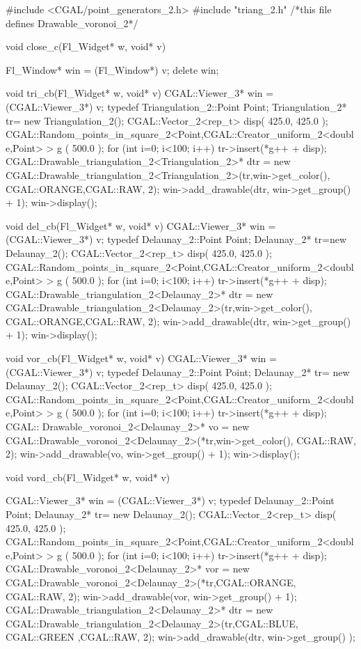 \begin{cprog} 
#include <CGAL/point_generators_2.h>
#include "triang_2.h"   /*this file defines Drawable_voronoi_2*/


void close_c(Fl_Widget* w, void* v)
{

  Fl_Window* win = (Fl_Window*) v;
  delete win;
}

void tri_cb(Fl_Widget* w, void* v)
{
  CGAL::Viewer_3* win = (CGAL::Viewer_3*) v;
  typedef Triangulation_2::Point Point;
  Triangulation_2* tr= new Triangulation_2();  
  CGAL::Vector_2<rep_t> disp( 425.0, 425.0 );
  CGAL::Random_points_in_square_2<Point,CGAL::Creator_uniform_2<double,Point> >
    g ( 500.0 );
  for (int i=0; i<100; i++)
    tr->insert(*g++ + disp);
  CGAL::Drawable_triangulation_2<Triangulation_2>* dtr = new CGAL::Drawable_triangulation_2<Triangulation_2>(tr,win->get_color(), CGAL::ORANGE,CGAL::RAW, 2);
  win->add_drawable(dtr, win->get_group() + 1);
  win->display();
}


void del_cb(Fl_Widget* w, void* v)
{
  CGAL::Viewer_3* win = (CGAL::Viewer_3*) v;
  typedef Delaunay_2::Point Point;
  Delaunay_2* tr=new Delaunay_2();  
  CGAL::Vector_2<rep_t> disp( 425.0, 425.0 );
  CGAL::Random_points_in_square_2<Point,CGAL::Creator_uniform_2<double,Point> >
    g ( 500.0 );
  for (int i=0; i<100; i++)
    tr->insert(*g++ + disp);
  CGAL::Drawable_triangulation_2<Delaunay_2>* dtr = new CGAL::Drawable_triangulation_2<Delaunay_2>(tr,win->get_color(),  CGAL::ORANGE,CGAL::RAW, 2);
  win->add_drawable(dtr, win->get_group() + 1);
  win->display();
}


void vor_cb(Fl_Widget* w, void* v)
{
  CGAL::Viewer_3* win = (CGAL::Viewer_3*) v;
  typedef Delaunay_2::Point Point;
  Delaunay_2* tr= new Delaunay_2();  
  CGAL::Vector_2<rep_t> disp( 425.0, 425.0 );
  CGAL::Random_points_in_square_2<Point,CGAL::Creator_uniform_2<double,Point> >
    g ( 500.0 );
  for (int i=0; i<100; i++)
    tr->insert(*g++ + disp);
  CGAL:: Drawable_voronoi_2<Delaunay_2>* vo = new CGAL::Drawable_voronoi_2<Delaunay_2>(*tr,win->get_color(), CGAL::RAW, 2);
  win->add_drawable(vo, win->get_group() + 1);
  win->display();
}


void vord_cb(Fl_Widget* w, void* v)
{
  CGAL::Viewer_3* win = (CGAL::Viewer_3*) v;
  typedef Delaunay_2::Point Point;
  Delaunay_2* tr= new Delaunay_2();  
  CGAL::Vector_2<rep_t> disp( 425.0, 425.0 );
  CGAL::Random_points_in_square_2<Point,CGAL::Creator_uniform_2<double,Point> >
    g ( 500.0 );
  for (int i=0; i<100; i++)
    tr->insert(*g++ + disp);
  CGAL::Drawable_voronoi_2<Delaunay_2>* vor = new CGAL::Drawable_voronoi_2<Delaunay_2>(*tr,CGAL::ORANGE, CGAL::RAW, 2);
  win->add_drawable(vor, win->get_group() + 1);
  CGAL::Drawable_triangulation_2<Delaunay_2>* dtr = new
    CGAL::Drawable_triangulation_2<Delaunay_2>(tr,CGAL::BLUE,
					       CGAL::GREEN ,CGAL::RAW, 2);
  win->add_drawable(dtr, win->get_group() );

}
\end{cprog}
